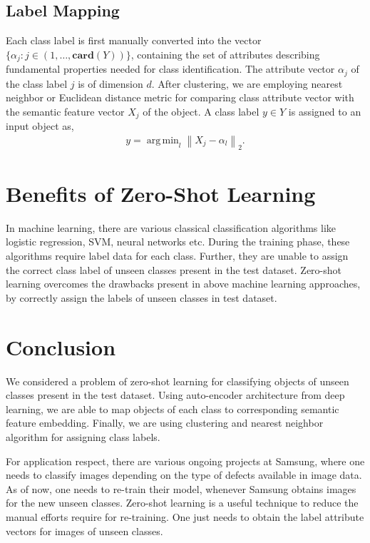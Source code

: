 \documentclass[11pt, conference, english]{IEEEtran}
\theoremstyle{plain}
\theoremstyle{definition}
\theoremstyle{remark}
\newcommand{\eq}[1]{\begin{align*}#1\end{align*}}
\newcommand{\norm}[1]{\left\lVert#1\right\rVert}
\DeclareMathOperator*{\argmin}{arg\,min}
\begin{document}
	\subsection{Label Mapping}
	Each class label is first manually converted into the vector $\{\alpha_j: j\in (1,\dots,\mathbf{card}(Y))\}$,
	containing the set of attributes describing fundamental properties needed for class identification. The attribute vector $\alpha_j$ of the class label $j$ is of dimension $d$. After clustering, we are employing nearest neighbor or Euclidean distance metric for comparing class attribute vector with the semantic feature vector $X_j$ of the object. A class label $y\in Y$ is assigned to an input object as,
	\eq{y=\argmin_l \norm{X_j-\alpha_l}_2.}
	\section{Benefits of Zero-Shot Learning}
In machine learning, there are various classical classification algorithms like logistic regression, SVM, neural networks etc. During the training phase, these algorithms require label data for each class. Further, they are unable to assign the correct class label of unseen classes present in the test dataset.
Zero-shot learning overcomes the drawbacks present in above machine learning approaches, by correctly assign the labels of unseen classes in test dataset.
	\section{Conclusion}
	We considered a problem of zero-shot learning for classifying objects of unseen classes present in the test dataset. Using auto-encoder architecture from deep learning, we are able to map objects of each class to corresponding semantic feature embedding. Finally, we are using clustering and nearest neighbor algorithm for assigning class labels.
	
	For application respect, there are various ongoing projects at Samsung, where one needs to classify images depending on the type of defects available in image data. As of now, one needs to re-train their model, whenever Samsung obtains images for the new unseen classes. Zero-shot learning is a useful technique to reduce the manual efforts require for re-training. One just needs to obtain the label attribute vectors for images of unseen classes. 
	
\end{document}
